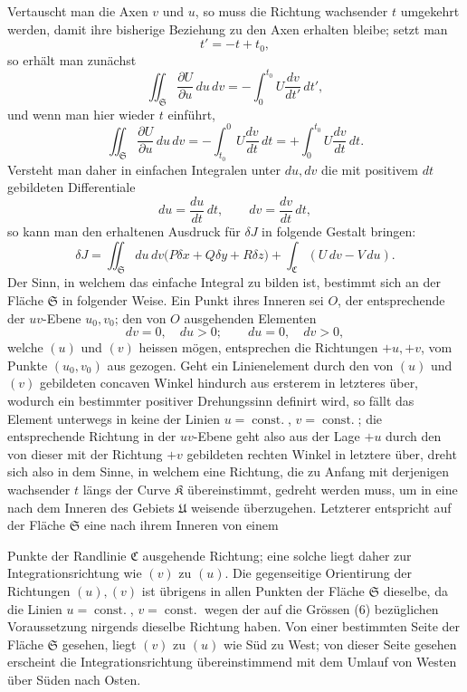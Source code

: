 \documentclass[11pt,a4paper,leqno]{article}
\begin{document}
Vertauscht man die Axen $v$ und $u$, so muss die Richtung
wachsender $t$ umgekehrt werden, damit ihre bisherige Beziehung
zu den Axen erhalten bleibe; setzt man
\[
t'=-t+t_0,
\]
so erhält man zunächst
\[
\iint_{\mathfrak{S}}\frac{\partial U}{\partial u}\,du\,dv
=-\int_0^{t_0}U\frac{dv}{dt'}\,dt',
\]
und wenn man hier wieder $t$ einführt,
\[
\iint_{\mathfrak{S}}\frac{\partial U}{\partial u}\,du\,dv
=-\int_{t_0}^{0}U\frac{dv}{dt}\,dt
=+\int_0^{t_0}U\frac{dv}{dt}\,dt.
\]
Versteht man daher in einfachen Integralen unter $du,dv$ die
mit positivem $dt$ gebildeten Differentiale
\[
du=\frac{du}{dt}\,dt,\qquad
dv=\frac{dv}{dt}\,dt,
\]
so kann man den erhaltenen Ausdruck für $\delta J$ in folgende Gestalt
bringen:
\[
\delta J=\iint_{\mathfrak{S}}du\,dv
\bigl(P\delta x+Q\delta y+R\delta z\bigr)
+\int_{\mathfrak{C}}(U\,dv-V\,du).
\]
Der Sinn, in welchem das einfache Integral zu bilden ist,
bestimmt sich an der Fläche $\mathfrak{S}$ in folgender Weise. Ein Punkt
ihres Inneren sei $O$, der entsprechende der $uv$-Ebene $u_0,v_0$; den
von $O$ ausgehenden Elementen
\[
dv=0,\quad du>0;\qquad du=0,\quad dv>0,
\]
welche $(u)$ und $(v)$ heissen mögen, entsprechen die Richtungen
$+u,+v$, vom Punkte $(u_0,v_0)$ aus gezogen. Geht ein Linienelement
durch den von $(u)$ und $(v)$ gebildeten concaven Winkel
hindurch aus ersterem in letzteres über, wodurch ein bestimmter
positiver Drehungssinn definirt wird, so fällt das Element unterwegs
in keine der Linien $u=\operatorname{const.}$, $v=\operatorname{const.}$; die entsprechende
Richtung in der $uv$-Ebene geht also aus der Lage $+u$ durch den
von dieser mit der Richtung $+v$ gebildeten rechten Winkel in
letztere über, dreht sich also in dem Sinne, in welchem eine
Richtung, die zu Anfang mit derjenigen wachsender $t$ längs der
Curve $\mathfrak{K}$ übereinstimmt, gedreht werden muss, um in eine nach
dem Inneren des Gebiets $\mathfrak{U}$ weisende überzugehen. Letzterer
entspricht auf der Fläche $\mathfrak{S}$ eine nach ihrem Inneren von einem

Punkte der Randlinie $\mathfrak{C}$ ausgehende Richtung; eine solche liegt
daher zur Integrationsrichtung wie $(v)$ zu $(u)$. Die gegenseitige
Orientirung der Richtungen $(u),(v)$ ist übrigens in allen Punkten
der Fläche $\mathfrak{S}$ dieselbe, da die Linien $u=\operatorname{const.}$, $v=\operatorname{const.}$
wegen der auf die Grössen (6) bezüglichen Voraussetzung nirgends
dieselbe Richtung haben. Von einer bestimmten Seite der
Fläche $\mathfrak{S}$ gesehen, liegt $(v)$ zu $(u)$ wie Süd zu West; von dieser
Seite gesehen erscheint die Integrationsrichtung übereinstimmend
mit dem Umlauf von Westen über Süden nach Osten.
\end{document}
